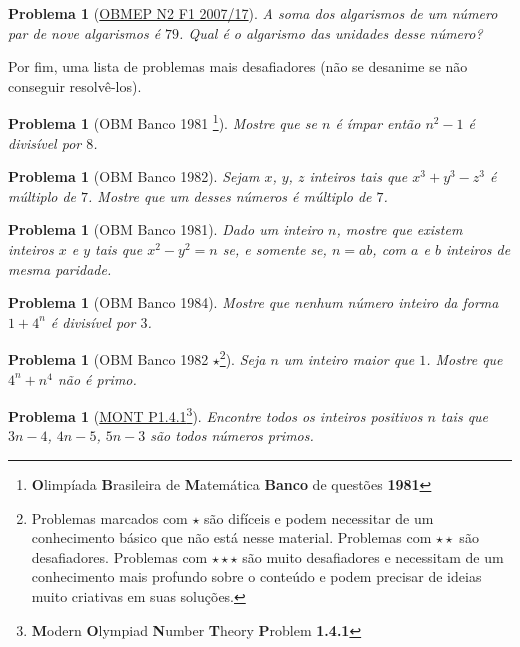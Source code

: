 \documentclass{article}
\newtheorem{problem}[theorem]{Problema}
\begin{document}
\begin{problem}[\href{https://drive.google.com/file/d/1E9jj8M2qJV168Jr3Ef7kgy9Oro0QsfIc/view}{OBMEP N2 F1 2007/17}]
A soma dos algarismos de um número par de nove algarismos é $79$. Qual é o algarismo das unidades desse número?
\end{problem}

Por fim, uma lista de problemas mais desafiadores (não se desanime se não conseguir resolvê-los).

\begin{problem}[OBM Banco 1981 \footnote{\textbf{O}limpíada \textbf{B}rasileira de \textbf{M}atemática \textbf{Banco} de questões \textbf{1981}}]
Mostre que se $n$ é ímpar então $n^2 - 1$ é divisível por $8$.
\end{problem}

\begin{problem}[OBM Banco 1982]
Sejam $x$, $y$, $z$ inteiros tais que $x^3 + y^3 - z^3$ é múltiplo de $7$. Mostre que um desses números é múltiplo de $7$.
\end{problem}

\begin{problem}[OBM Banco 1981]
Dado um inteiro $n$, mostre que existem inteiros $x$ e $y$ tais que $x^2 - y^2 = n$ se, e somente se, $n = ab$, com $a$ e $b$ inteiros de mesma paridade.
\end{problem}

\begin{problem}[OBM Banco 1984]
Mostre que nenhum número inteiro da forma $1 + 4^n$ é divisível por $3$.
\end{problem}

\begin{problem}[OBM Banco 1982 $\star$\footnote{Problemas marcados com $\star$ são difíceis e podem necessitar de um conhecimento básico que não está nesse material. Problemas com $\star \star$ são desafiadores. Problemas com $\star \star \star$ são muito desafiadores e necessitam de um conhecimento mais profundo sobre o conteúdo e podem precisar de ideias muito criativas em suas soluções.}]
Seja $n$ um inteiro maior que $1$. Mostre que $4^n + n^4$ não é primo.
\end{problem}

\begin{problem}[\href{https://artofproblemsolving.com/community/c1610044h2349401_problem_141}{MONT P1.4.1}\footnote{\textbf{M}odern \textbf{O}lympiad \textbf{N}umber \textbf{T}heory \textbf{P}roblem \textbf{1.4.1}}]
Encontre todos os inteiros positivos $n$ tais que $3n - 4$, $4n - 5$, $5n - 3$ são todos números primos.
\end{problem}
\end{document}
